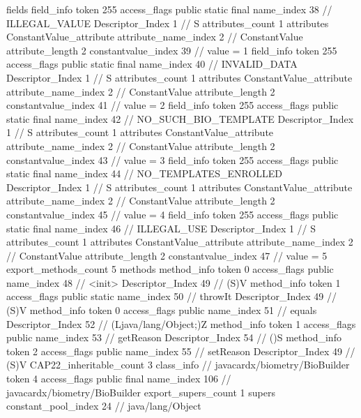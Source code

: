 {{{			fields {
			field_info {
				token	255
				access_flags	public static final
				name_index	38		// ILLEGAL_VALUE
				Descriptor_Index	1		// S
				attributes_count	1
				attributes {
				ConstantValue_attribute {
					attribute_name_index	2		// ConstantValue
					attribute_length	2
					constantvalue_index	39		// value = 1
				}
				}
			}
			field_info {
				token	255
				access_flags	public static final
				name_index	40		// INVALID_DATA
				Descriptor_Index	1		// S
				attributes_count	1
				attributes {
				ConstantValue_attribute {
					attribute_name_index	2		// ConstantValue
					attribute_length	2
					constantvalue_index	41		// value = 2
				}
				}
			}
			field_info {
				token	255
				access_flags	public static final
				name_index	42		// NO_SUCH_BIO_TEMPLATE
				Descriptor_Index	1		// S
				attributes_count	1
				attributes {
				ConstantValue_attribute {
					attribute_name_index	2		// ConstantValue
					attribute_length	2
					constantvalue_index	43		// value = 3
				}
				}
			}
			field_info {
				token	255
				access_flags	public static final
				name_index	44		// NO_TEMPLATES_ENROLLED
				Descriptor_Index	1		// S
				attributes_count	1
				attributes {
				ConstantValue_attribute {
					attribute_name_index	2		// ConstantValue
					attribute_length	2
					constantvalue_index	45		// value = 4
				}
				}
			}
			field_info {
				token	255
				access_flags	public static final
				name_index	46		// ILLEGAL_USE
				Descriptor_Index	1		// S
				attributes_count	1
				attributes {
				ConstantValue_attribute {
					attribute_name_index	2		// ConstantValue
					attribute_length	2
					constantvalue_index	47		// value = 5
				}
				}
			}
			}
			export_methods_count	5
			methods {
				method_info {
					token	0
					access_flags	public
					name_index	48		// <init>
					Descriptor_Index	49		// (S)V
				}
				method_info {
					token	1
					access_flags	public static
					name_index	50		// throwIt
					Descriptor_Index	49		// (S)V
				}
				method_info {
					token	0
					access_flags	public
					name_index	51		// equals
					Descriptor_Index	52		// (Ljava/lang/Object;)Z
				}
				method_info {
					token	1
					access_flags	public
					name_index	53		// getReason
					Descriptor_Index	54		// ()S
				}
				method_info {
					token	2
					access_flags	public
					name_index	55		// setReason
					Descriptor_Index	49		// (S)V
				}
			}
			CAP22_inheritable_count	3
		}
		class_info {		// javacardx/biometry/BioBuilder
			token	4
			access_flags	public final
			name_index	106		// javacardx/biometry/BioBuilder
			export_supers_count	1
			supers {
				constant_pool_index	24		// java/lang/Object
}}}}
